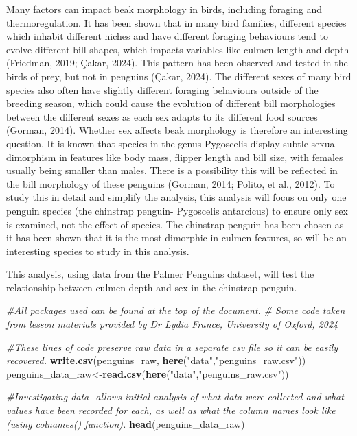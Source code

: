 \documentclass[
]{article}
\newenvironment{Shaded}{\begin{snugshade}}{\end{snugshade}}
\newcommand{\CommentTok}[1]{\textcolor[rgb]{0.56,0.35,0.01}{\textit{#1}}}
\newcommand{\FunctionTok}[1]{\textcolor[rgb]{0.13,0.29,0.53}{\textbf{#1}}}
\newcommand{\NormalTok}[1]{#1}
\newcommand{\OtherTok}[1]{\textcolor[rgb]{0.56,0.35,0.01}{#1}}
\newcommand{\StringTok}[1]{\textcolor[rgb]{0.31,0.60,0.02}{#1}}
\begin{document}
Many factors can impact beak morphology in birds, including foraging and
thermoregulation. It has been shown that in many bird families,
different species which inhabit different niches and have different
foraging behaviours tend to evolve different bill shapes, which impacts
variables like culmen length and depth (Friedman, 2019; Çakar, 2024).
This pattern has been observed and tested in the birds of prey, but not
in penguins (Çakar, 2024). The different sexes of many bird species also
often have slightly different foraging behaviours outside of the
breeding season, which could cause the evolution of different bill
morphologies between the different sexes as each sex adapts to its
different food sources (Gorman, 2014). Whether sex affects beak
morphology is therefore an interesting question. It is known that
species in the genus Pygoscelis display subtle sexual dimorphism in
features like body mass, flipper length and bill size, with females
usually being smaller than males. There is a possibility this will be
reflected in the bill morphology of these penguins (Gorman, 2014;
Polito, et al., 2012). To study this in detail and simplify the
analysis, this analysis will focus on only one penguin species (the
chinstrap penguin- Pygoscelis antarcicus) to ensure only sex is
examined, not the effect of species. The chinstrap penguin has been
chosen as it has been shown that it is the most dimorphic in culmen
features, so will be an interesting species to study in this analysis.

This analysis, using data from the Palmer Penguins dataset, will test
the relationship between culmen depth and sex in the chinstrap penguin.

\begin{Shaded}
\begin{Highlighting}[]
\CommentTok{\#All packages used can be found at the top of the document.}
\CommentTok{\# Some code taken from lesson materials provided by Dr Lydia France, University of Oxford, 2024}

\CommentTok{\#These lines of code preserve raw data in a separate csv file so it can be easily recovered.}
\FunctionTok{write.csv}\NormalTok{(penguins\_raw, }\FunctionTok{here}\NormalTok{(}\StringTok{"data"}\NormalTok{,}\StringTok{"penguins\_raw.csv"}\NormalTok{))}
\NormalTok{penguins\_data\_raw}\OtherTok{\textless{}{-}}\FunctionTok{read.csv}\NormalTok{(}\FunctionTok{here}\NormalTok{(}\StringTok{"data"}\NormalTok{,}\StringTok{"penguins\_raw.csv"}\NormalTok{))}

\CommentTok{\#Investigating data{-} allows initial analysis of what data were collected and what values have been recorded for each, as well as what the column names look like (using colnames() function).}
\FunctionTok{head}\NormalTok{(penguins\_data\_raw)}
\end{Highlighting}
\end{Shaded}
\end{document}
